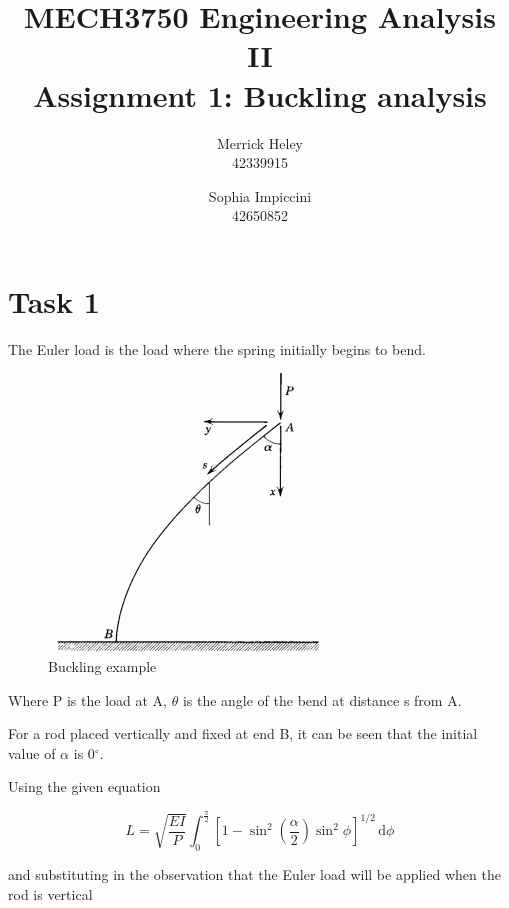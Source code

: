\documentclass[a4paper,11pt,titlepage]{article}
\title{
MECH3750 Engineering Analysis II \\ 
Assignment 1: Buckling analysis
}
\author{
Merrick Heley\\
42339915
\and
Sophia Impiccini\\
42650852
}
\newcommand{\ud}{\,\mathrm{d}}
\begin{document}
\maketitle

\section*{Task 1}

The Euler load is the load where the spring initially begins to bend.

\begin{figure}[!hbp]
\centering
\includegraphics{buckling.png}
\caption{Buckling example}
\end{figure}

Where P is the load at A, $\theta$ is the angle of the bend at distance s 
from A.

For a rod placed vertically and fixed at end B, it can be seen that the initial
value of $\alpha$ is 0$^\circ$.

Using the given equation

\begin{equation}
L = 
\sqrt{\frac{EI}{P}} 
\int_0^{\frac{\pi}{2}} 
    {\displaystyle{\left[
        1-\sin^2{\left(\frac{\alpha}{2}\right)}\sin^2{\phi}
    \right]^{1/2}}}
\ud \phi
\end{equation}

and substituting in the observation that the Euler load will be applied when the
rod is vertical
\end{document}
